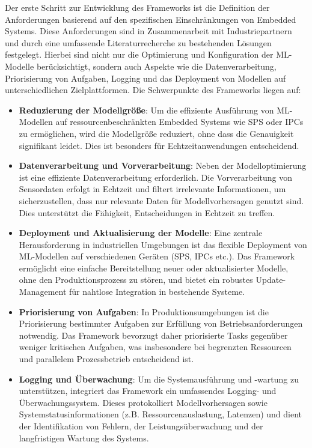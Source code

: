 Der erste Schritt zur Entwicklung des Frameworks ist die Definition der Anforderungen basierend auf den spezifischen Einschränkungen von Embedded Systems. 
Diese Anforderungen sind in Zusammenarbeit mit Industriepartnern und durch eine umfassende Literaturrecherche zu bestehenden Lösungen festgelegt. Hierbei sind nicht 
nur die Optimierung und Konfiguration der ML-Modelle berücksichtigt, sondern auch Aspekte wie die Datenverarbeitung, Priorisierung von Aufgaben, Logging und das Deployment 
von Modellen auf unterschiedlichen Zielplattformen. Die Schwerpunkte des Frameworks liegen auf:
\begin{itemize}
    \item \textbf{Reduzierung der Modellgröße}: Um die effiziente Ausführung von ML-Modellen auf ressourcenbeschränkten Embedded Systems wie SPS oder IPCs zu ermöglichen, 
    wird die Modellgröße reduziert, ohne dass die Genauigkeit signifikant leidet. Dies ist besonders für Echtzeitanwendungen entscheidend.   
    \item \textbf{Datenverarbeitung und Vorverarbeitung}: Neben der Modelloptimierung ist eine effiziente Datenverarbeitung erforderlich. Die Vorverarbeitung von Sensordaten 
    erfolgt in Echtzeit und filtert irrelevante Informationen, um sicherzustellen, dass nur relevante Daten für Modellvorhersagen genutzt sind. Dies unterstützt die Fähigkeit, 
    Entscheidungen in Echtzeit zu treffen.
   
    \item \textbf{Deployment und Aktualisierung der Modelle}: Eine zentrale Herausforderung in industriellen Umgebungen ist das flexible Deployment von ML-Modellen auf 
    verschiedenen Geräten (SPS, IPCs etc.). Das Framework ermöglicht eine einfache Bereitstellung neuer oder aktualisierter Modelle, ohne den Produktionsprozess zu stören, 
    und bietet ein robustes Update-Management für nahtlose Integration in bestehende Systeme.
  
    \item \textbf{Priorisierung von Aufgaben}: In Produktionsumgebungen ist die Priorisierung bestimmter Aufgaben zur Erfüllung von Betriebsanforderungen notwendig. 
    Das Framework bevorzugt daher priorisierte Tasks gegenüber weniger kritischen Aufgaben, was insbesondere bei begrenzten Ressourcen und parallelem Prozessbetrieb entscheidend ist.
   
    \item \textbf{Logging und Überwachung}: Um die Systemausführung und -wartung zu unterstützen, integriert das Framework ein umfassendes Logging- und Überwachungssystem. 
    Dieses protokolliert Modellvorhersagen sowie Systemstatusinformationen (z.B. Ressourcenauslastung, Latenzen) und dient der Identifikation von Fehlern, der 
    Leistungsüberwachung und der langfristigen Wartung des Systems.
  

\end{itemize}
